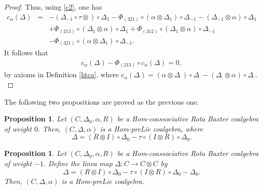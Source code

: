 \documentclass{article}
\newtheorem{prop}[thm]{Proposition}
\theoremstyle{definition}
\theoremstyle{remark}
\numberwithin{equation}{section}
\begin{document}
\begin{proof}
 Thus, using \ref{c2}, one has
 \begin{eqnarray}
 c_\alpha(\Delta)&=&-(\Delta_{-1}\circ\tau\otimes)\circ\Delta_{1}-\Phi_{(321)}\circ(\alpha\otimes\Delta_{1})\circ\Delta_{-1}
 -(\Delta_{-1}\otimes\alpha)\circ\Delta_{1}\nonumber\\
&&+\Phi_{(213)}\circ(\Delta_{1}\otimes\alpha)\circ\Delta_{1}+\Phi_{(312)}\circ(\Delta_{1}\otimes\alpha)\circ\Delta_{-1}\nonumber\\
 &&-\Phi_{(321)}\circ(\alpha\otimes\Delta_{1})\circ\Delta_{-1}\nonumber.
 \end{eqnarray}
 It follows that 
 \begin{eqnarray}
  c_\alpha(\Delta)-\Phi_{(213)}\circ c_\alpha(\Delta)=0,\nonumber
 \end{eqnarray}
 by axioms in Definition \ref{htca}, where  $c_\alpha(\Delta)=(\alpha\otimes\Delta_\cdot)\circ\Delta_\cdot-(\Delta_\cdot\otimes\alpha)\circ\Delta_\cdot.$
 \end{proof}
 The following two propositions are proved as the previous one.
 \begin{prop}
  Let $(C, \Delta_0, \alpha, R)$ be a Hom-coassociative Rota Baxter coalgebra of weight $0$.
Then, $(C, \Delta, \alpha)$ is a Hom-preLie coalgebra, where
 $$\Delta=(R\otimes I)\circ\Delta_0-\tau\circ(I\otimes R)\circ\Delta_0.$$
 \end{prop}
 
 \begin{prop}
   Let $(C, \Delta_0, \alpha, R)$ be a Hom-coassociative Rota Baxter coalgebra of weight $-1$.
 Define the linea map $\Delta : C\rightarrow C\otimes C$ by
 $$\Delta=(R\otimes I)\circ\Delta_0-\tau\circ(I\otimes R)\circ\Delta_0-\Delta_0 .$$
 Then, $(C, \Delta, \alpha)$ is a Hom-preLie coalgebra.
 \end{prop}
\end{document}
